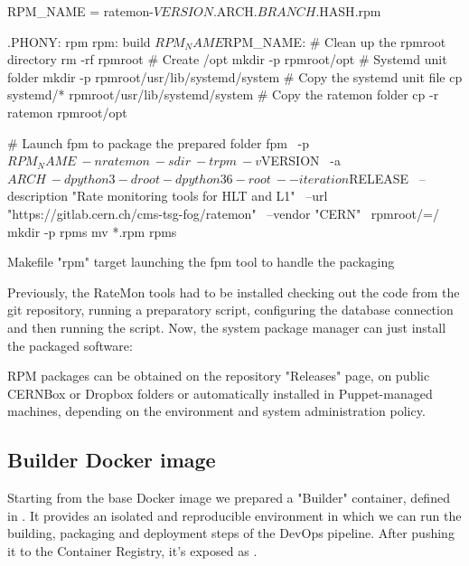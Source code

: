 \begin{listing}[ht]
\begin{yamlcode}

RPM_NAME = ratemon-${VERSION}.${ARCH}.${BRANCH}.${HASH}.rpm

.PHONY: rpm
rpm: build ${RPM_NAME}
${RPM_NAME}:
  # Clean up the rpmroot directory
  rm -rf rpmroot
  # Create /opt
  mkdir -p rpmroot/opt
  # Systemd unit folder
  mkdir -p rpmroot/usr/lib/systemd/system
  # Copy the systemd unit file
  cp systemd/* rpmroot/usr/lib/systemd/system
  # Copy the ratemon folder
  cp -r ratemon rpmroot/opt

  # Launch fpm to package the prepared folder 
  fpm \
  -p ${RPM_NAME} \
  -n ratemon \
  -s dir \
  -t rpm \
  -v ${VERSION} \
  -a ${ARCH} \
  -d python3 -d root -d python36-root \
  --iteration ${RELEASE} \
  --description "Rate monitoring tools for HLT and L1" \
  --url "https://gitlab.cern.ch/cms-tsg-fog/ratemon" \
  --vendor "CERN" \
  rpmroot/=/
  mkdir -p rpms
  mv *.rpm rpms
\end{yamlcode}
\caption{Makefile "rpm" target launching the fpm tool to handle the packaging}
\end{listing}

Previously, the RateMon tools had to be installed checking out the code from the git repository, running a preparatory script, configuring the database connection and then running the script. Now, the system package manager can just install the packaged software:

\begin{textcode}
P5 $ yum install ratemon_0.1.rpm
\end{textcode}

RPM packages can be obtained on the repository "Releases" page, on public CERNBox or Dropbox folders or automatically installed in Puppet-managed machines, depending on the environment and system administration policy.

\subsection{Builder Docker image}

Starting from the  base Docker image we prepared a "Builder" container, defined in . It provides an isolated and reproducible environment in which we can run the building, packaging and deployment steps of the DevOps pipeline.
After pushing it to the Container Registry, it's exposed as .

